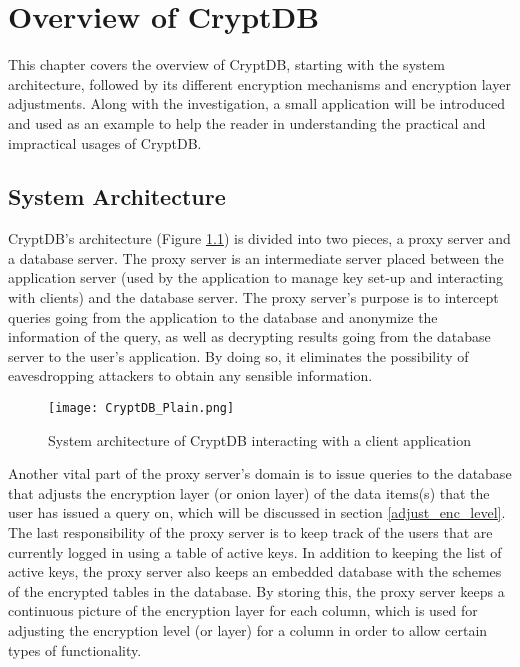\chapter{Overview of CryptDB}
\label{chp:overview_cryptDB}

This chapter covers the overview of CryptDB, starting with the system architecture, followed by its different encryption mechanisms and encryption layer adjustments. Along with the investigation, a small application will be introduced and used as an example to help the reader in understanding the practical and impractical usages of CryptDB.

\section{System Architecture}

CryptDB's architecture (Figure \ref{cryptdb_plain}) is divided into two pieces, a proxy server and a database server. The proxy server is an intermediate server placed between the application server (used by the application to manage key set-up and interacting with clients) and the database server. The proxy server's purpose is to intercept queries going from the application to the database and anonymize the information of the query, as well as decrypting results going from the database server to the user's application. By doing so, it eliminates the possibility of eavesdropping attackers to obtain any sensible information. %

\begin{figure}[H]
	\texttt{[image: CryptDB\_Plain.png]}
	\caption{System architecture of CryptDB interacting with a client application}
	\label{cryptdb_plain}
\end{figure}

Another vital part of the proxy server's domain is to issue queries to the database that adjusts the encryption layer (or onion layer) of the data items(s) that the user has issued a query on, which will be discussed in section \ref{adjust_enc_level}. The last responsibility of the proxy server is to keep track of the users that are currently logged in using a table of active keys. In addition to keeping the list of active keys, the proxy server also keeps an embedded database with the schemes of the encrypted tables in the database. By storing this, the proxy server keeps a continuous picture of the encryption layer for each column, which is used for adjusting the encryption level (or layer) for a column in order to allow certain types of functionality.

